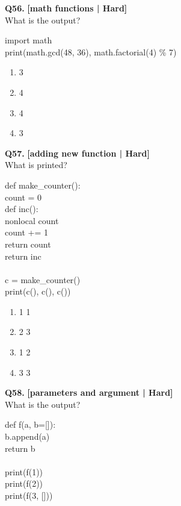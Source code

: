 \noindent\textbf{Q56.} \hfill {\small\color{LPUOrange}\textbf{[math functions | Hard]}}\\[2pt]
What is the output? 

\begin{pycode}
import math\\
print(math.gcd(48, 36), math.factorial(4) \% 7)
\end{pycode}

\begin{enumerate}[label=(\alph*),topsep=2pt,itemsep=1pt,partopsep=0pt,parsep=0pt]
    \item {} 3
    \item {} 4
    \item {} 4
    \item {} 3
\end{enumerate}
\vspace{2mm}

\noindent\textbf{Q57.} \hfill {\small\color{LPUOrange}\textbf{[adding new function | Hard]}}\\[2pt]
What is printed? 

\begin{pycode}
def make\_counter():\\
count = 0\\
def inc():\\
nonlocal count\\
count += 1\\
return count\\
return inc\\
~\\
c = make\_counter()\\
print(c(), c(), c())
\end{pycode}

\begin{enumerate}[label=(\alph*),topsep=2pt,itemsep=1pt,partopsep=0pt,parsep=0pt]
    \item {} 1 1
    \item {} 2 3
    \item {} 1 2
    \item {} 3 3
\end{enumerate}
\vspace{2mm}

\noindent\textbf{Q58.} \hfill {\small\color{LPUOrange}\textbf{[parameters and argument | Hard]}}\\[2pt]
What is the output? 

\begin{pycode}
def f(a, b=[]):\\
b.append(a)\\
return b\\
~\\
print(f(1))\\
print(f(2))\\
print(f(3, []))
\end{pycode}

